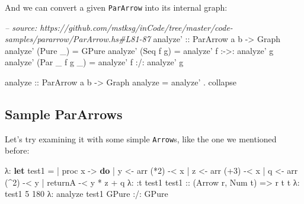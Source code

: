 \documentclass[]{article}
\newenvironment{Shaded}{}{}
\newcommand{\KeywordTok}[1]{\textcolor[rgb]{0.00,0.44,0.13}{\textbf{#1}}}
\newcommand{\DataTypeTok}[1]{\textcolor[rgb]{0.56,0.13,0.00}{#1}}
\newcommand{\DecValTok}[1]{\textcolor[rgb]{0.25,0.63,0.44}{#1}}
\newcommand{\CommentTok}[1]{\textcolor[rgb]{0.38,0.63,0.69}{\textit{#1}}}
\newcommand{\OtherTok}[1]{\textcolor[rgb]{0.00,0.44,0.13}{#1}}
\newcommand{\FunctionTok}[1]{\textcolor[rgb]{0.02,0.16,0.49}{#1}}
\newcommand{\NormalTok}[1]{#1}
\begin{document}
And we can convert a given \texttt{ParArrow} into its internal graph:

\begin{Shaded}
\begin{Highlighting}[]
\CommentTok{-- source: https://github.com/mstksg/inCode/tree/master/code-samples/pararrow/ParArrow.hs#L81-87}
\OtherTok{analyze' ::} \DataTypeTok{ParArrow}\NormalTok{ a b }\OtherTok{->} \DataTypeTok{Graph}
\NormalTok{analyze' (}\DataTypeTok{Pure}\NormalTok{ _) }\FunctionTok{=} \DataTypeTok{GPure}
\NormalTok{analyze' (}\DataTypeTok{Seq}\NormalTok{ f g) }\FunctionTok{=}\NormalTok{ analyze' f }\FunctionTok{:->:}\NormalTok{ analyze' g}
\NormalTok{analyze' (}\DataTypeTok{Par}\NormalTok{ _ f g _) }\FunctionTok{=}\NormalTok{ analyze' f }\FunctionTok{:/:}\NormalTok{ analyze' g}

\OtherTok{analyze ::} \DataTypeTok{ParArrow}\NormalTok{ a b }\OtherTok{->} \DataTypeTok{Graph}
\NormalTok{analyze }\FunctionTok{=}\NormalTok{ analyze' }\FunctionTok{.}\NormalTok{ collapse}
\end{Highlighting}
\end{Shaded}

\subsection{Sample ParArrows}\label{sample-pararrows}

Let's try examining it with some simple \texttt{Arrow}s, like the one we
mentioned before:

\begin{Shaded}
\begin{Highlighting}[]
\NormalTok{λ}\FunctionTok{:} \KeywordTok{let}\NormalTok{ test1 }\FunctionTok{=}
 \FunctionTok{|}\NormalTok{       proc x }\OtherTok{->} \KeywordTok{do}
 \FunctionTok{|}\NormalTok{       y }\OtherTok{<-}\NormalTok{ arr (}\FunctionTok{*}\DecValTok{2}\NormalTok{) }\FunctionTok{-<}\NormalTok{ x}
 \FunctionTok{|}\NormalTok{       z }\OtherTok{<-}\NormalTok{ arr (}\FunctionTok{+}\DecValTok{3}\NormalTok{) }\FunctionTok{-<}\NormalTok{ x}
 \FunctionTok{|}\NormalTok{       q }\OtherTok{<-}\NormalTok{ arr (}\FunctionTok{^}\DecValTok{2}\NormalTok{) }\FunctionTok{-<}\NormalTok{ y}
 \FunctionTok{|}\NormalTok{       returnA }\FunctionTok{-<}\NormalTok{ y }\FunctionTok{*}\NormalTok{ z }\FunctionTok{+}\NormalTok{ q}
\NormalTok{λ}\FunctionTok{:} \FunctionTok{:}\NormalTok{t test1}
\OtherTok{test1 ::}\NormalTok{ (}\DataTypeTok{Arrow}\NormalTok{ r, }\DataTypeTok{Num}\NormalTok{ t) }\OtherTok{=>}\NormalTok{ r t t}
\NormalTok{λ}\FunctionTok{:}\NormalTok{ test1 }\DecValTok{5}
\DecValTok{180}
\NormalTok{λ}\FunctionTok{:}\NormalTok{ analyze test1}
\DataTypeTok{GPure} \FunctionTok{:/:} \DataTypeTok{GPure}
\end{Highlighting}
\end{Shaded}
\end{document}
